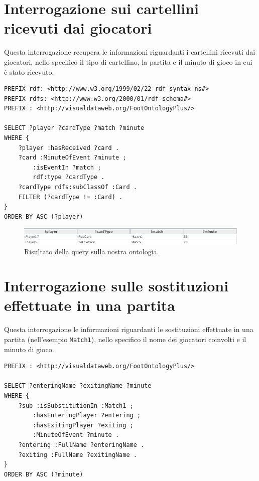 \documentclass[11pt]{report} %
\begin{document}
\section{Interrogazione sui cartellini ricevuti dai giocatori}

Questa interrogazione recupera le informazioni riguardanti i cartellini ricevuti dai giocatori, nello specifico il tipo di cartellino, la partita e il minuto di gioco in cui è stato ricevuto. 

\begin{lstlisting}
PREFIX rdf: <http://www.w3.org/1999/02/22-rdf-syntax-ns#>
PREFIX rdfs: <http://www.w3.org/2000/01/rdf-schema#>
PREFIX : <http://visualdataweb.org/FootOntologyPlus/>

SELECT ?player ?cardType ?match ?minute
WHERE {
    ?player :hasReceived ?card .
    ?card :MinuteOfEvent ?minute ;
        :isEventIn ?match ;
        rdf:type ?cardType .
    ?cardType rdfs:subClassOf :Card .
    FILTER (?cardType != :Card) .
}
ORDER BY ASC (?player)
\end{lstlisting}

\begin{figure}[H]
	\includegraphics[width=\textwidth]{query3}
	\caption{Risultato della query sulla nostra ontologia.}
\end{figure}

\section{Interrogazione sulle sostituzioni effettuate in una partita}

Questa interrogazione le informazioni riguardanti le sostituzioni effettuate in una partita (nell'esempio \texttt{Match1}), nello specifico il nome dei giocatori coinvolti e il minuto di gioco. 

\begin{lstlisting}
PREFIX : <http://visualdataweb.org/FootOntologyPlus/>

SELECT ?enteringName ?exitingName ?minute
WHERE {
    ?sub :isSubstitutionIn :Match1 ;
        :hasEnteringPlayer ?entering ;
        :hasExitingPlayer ?exiting ;
        :MinuteOfEvent ?minute .
    ?entering :FullName ?enteringName .
    ?exiting :FullName ?exitingName .
}
ORDER BY ASC (?minute)
\end{lstlisting}
\end{document}
